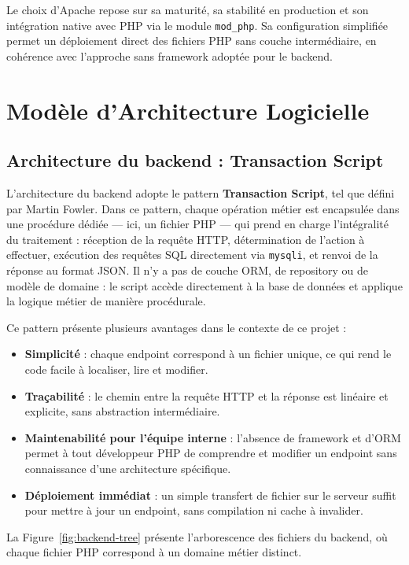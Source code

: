 \documentclass[12pt,a4paper]{article}
\begin{document}
    Le choix d'Apache repose sur sa maturité, sa stabilité en production et son intégration native avec PHP via le module \texttt{mod\_php}. Sa configuration simplifiée permet un déploiement direct des fichiers PHP sans couche intermédiaire, en cohérence avec l'approche sans framework adoptée pour le backend.

    \section{Modèle d'Architecture Logicielle}

    \subsection{Architecture du backend : Transaction Script}

    L'architecture du backend adopte le pattern \textbf{Transaction Script}, tel que défini par Martin Fowler. Dans ce pattern, chaque opération métier est encapsulée dans une procédure dédiée — ici, un fichier PHP — qui prend en charge l'intégralité du traitement : réception de la requête HTTP, détermination de l'action à effectuer, exécution des requêtes SQL directement via \texttt{mysqli}, et renvoi de la réponse au format JSON. Il n'y a pas de couche ORM, de repository ou de modèle de domaine : le script accède directement à la base de données et applique la logique métier de manière procédurale.

    Ce pattern présente plusieurs avantages dans le contexte de ce projet :
    \begin{itemize}[leftmargin=1.2em]
    \item \textbf{Simplicité} : chaque endpoint correspond à un fichier unique, ce qui rend le code facile à localiser, lire et modifier.
    \item \textbf{Traçabilité} : le chemin entre la requête HTTP et la réponse est linéaire et explicite, sans abstraction intermédiaire.
    \item \textbf{Maintenabilité pour l'équipe interne} : l'absence de framework et d'ORM permet à tout développeur PHP de comprendre et modifier un endpoint sans connaissance d'une architecture spécifique.
    \item \textbf{Déploiement immédiat} : un simple transfert de fichier sur le serveur suffit pour mettre à jour un endpoint, sans compilation ni cache à invalider.
    \end{itemize}

    La Figure~\ref{fig:backend-tree} présente l'arborescence des fichiers du backend, où chaque fichier PHP correspond à un domaine métier distinct.
\end{document}
